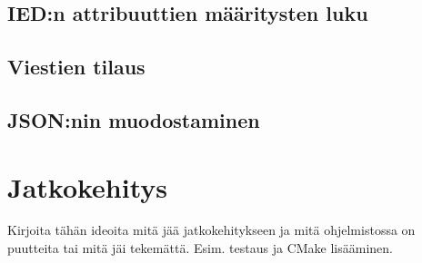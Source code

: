 \subsection{IED:n attribuuttien määritysten luku}


\subsection{Viestien tilaus}


\subsection{JSON:nin muodostaminen}


\section{Jatkokehitys}
\begin{it}
	Kirjoita tähän ideoita mitä jää jatkokehitykseen ja mitä ohjelmistossa on puutteita tai mitä jäi tekemättä. Esim. testaus ja CMake lisääminen.
\end{it}